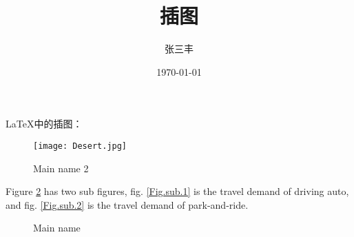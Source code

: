 \documentclass[cct]{article}
\title{插图}
\author{张三丰}
\date{\today}
\begin{document}
	\maketitle
	\LaTeX{}中的插图：
	
	\begin{figure}[H] %
		\centering %
		\texttt{[image: Desert.jpg]}
		\caption{Main name 2} %
		\label{Fig.main2} %
	\end{figure}
	Figure \ref{Fig.main} has two sub figures, fig. \ref{Fig.sub.1} is the travel demand of driving auto, and fig. \ref{Fig.sub.2} is the travel demand of park-and-ride.
	
	\begin{figure}[H]
		\centering  %
		\caption{Main name}
		\label{Fig.main}
	\end{figure}
\end{document}
